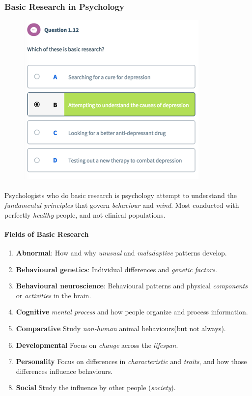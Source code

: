 \documentclass{article}
\begin{document}
	\subsubsection{Basic Research in Psychology}
	\begin{figure}[H]
		\centering
		\includegraphics{psy100/0112}	
	\end{figure}

	\paragraph{}Psychologists who do basic research is psychology attempt to understand the \emph{fundamental principles} that govern \emph{behaviour} and \emph{mind}.
	\newline Most conducted with perfectly \emph{healthy} people, and not clinical populations.
	\paragraph{Fields of Basic Research}
	\begin{enumerate}
		\item \textbf{Abnormal}: How and why \emph{unusual} and \emph{maladaptive} patterns develop.
		\item \textbf{Behavioural genetics}: Individual differences and \emph{genetic factors}.
		\item \textbf{Behavioural neuroscience}: Behavioural patterns and physical \emph{components} or \emph{activities} in the brain.
		\item \textbf{Cognitive} \emph{mental process} and how people organize and process information.
		\item \textbf{Comparative} Study \emph{non-human} animal behaviours(but not always).
		\item \textbf{Developmental} Focus on \emph{change} across the \emph{lifespan}.
		\item \textbf{Personality} Focus on differences in \emph{characteristic} and \emph{traits}, and how those differences influence behaviours.
		\item \textbf{Social} Study the influence by other people (\emph{society}).
 	\end{enumerate}
\end{document}
